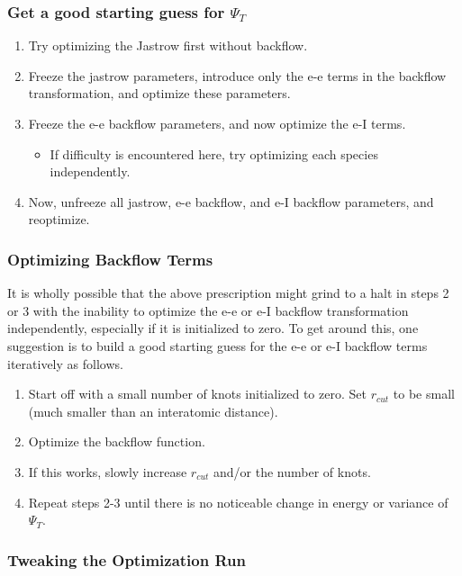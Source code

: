 \subsubsection{Get a good starting guess for $\Psi_T$}

\begin{enumerate}
\item Try optimizing the Jastrow first without backflow.
\item Freeze the jastrow parameters, introduce only the e-e terms in the backflow transformation, and optimize these parameters.
\item Freeze the e-e backflow parameters, and now optimize the e-I terms.
  \begin{itemize}
    \item If difficulty is encountered here, try optimizing each species independently.
  \end{itemize}
\item Now, unfreeze all jastrow, e-e backflow, and e-I backflow parameters, and reoptimize.  

\end{enumerate}


\subsubsection{Optimizing Backflow Terms}

It is wholly possible that the above prescription might grind to a halt in steps 2 or 3 with the inability to optimize the e-e or e-I backflow transformation independently, especially if it is initialized to zero.  To get around this, one suggestion is to build a good starting guess for the e-e or e-I backflow terms iteratively as follows.  

\begin{enumerate}
\item Start off with a small number of knots initialized to zero.  Set $r_{cut}$ to be small (much smaller than an interatomic distance).
\item Optimize the backflow function.
\item If this works, slowly increase $r_{cut}$ and/or the number of knots.
\item Repeat steps 2-3 until there is no noticeable change in energy or variance of $\Psi_T$.
\end{enumerate}

\subsubsection{Tweaking the Optimization Run}

